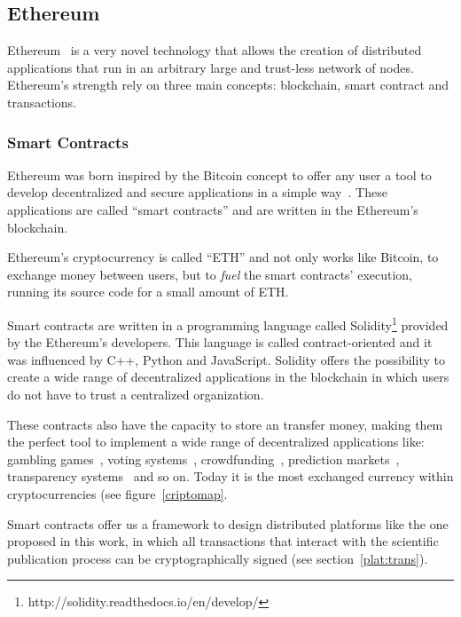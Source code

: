 \subsection{Ethereum}
\label{tb:eth}
Ethereum~\cite{buterin2014ethereum} is a very novel technology that allows the
creation of distributed applications that run in an arbitrary large and
trust-less network of nodes. Ethereum's strength rely on three main concepts:
blockchain, smart contract and transactions.

\subsubsection*{Smart Contracts}
\label{tb:cryptos:sm}

Ethereum was born inspired by the Bitcoin concept to offer any user a tool to
develop decentralized and secure applications in a simple
way~\cite{buterin2014ethereum}. These applications are called ``smart
contracts'' and are written in the Ethereum's blockchain.

Ethereum's cryptocurrency is called ``ETH'' and not only works like Bitcoin, to
exchange money between users, but to \emph{fuel} the smart contracts' execution,
running its source code for a small amount of ETH.

Smart contracts are written in a programming language called
Solidity\footnote{http://solidity.readthedocs.io/en/develop/} provided by the
Ethereum's developers. This language is called contract-oriented and it was
influenced by C++, Python and JavaScript. Solidity offers the possibility to
create a wide range of decentralized applications in the blockchain in which
users do not have to trust a centralized organization.

These contracts also have the capacity to store an transfer money, making them
the perfect tool to implement a wide range of decentralized applications like:
gambling games~\cite{piasecki2016gaming}, voting
systems~\cite{mccorry2017smart}, crowdfunding~\cite{jacynycz2016betfunding},
prediction markets~\cite{peterson2015augur}, transparency
systems~\cite{bonneau2016ethiks} and so on. Today it is the most exchanged
currency within cryptocurrencies (see figure~\ref{criptomap}.

Smart contracts offer us a framework to design distributed platforms like the
one proposed in this work, in which all transactions that interact with the
scientific publication process can be cryptographically signed (see
section~\ref{plat:trans}).

